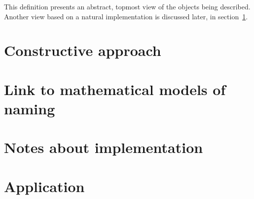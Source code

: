 \documentclass{article}
\begin{document}
This definition presents an abstract, topmost view of the objects being
described. Another view based on a natural implementation is discussed later,
in section~\ref{sec:constructive}.

\section{Constructive approach}\label{sec:constructive}

\section{Link to mathematical models of naming}

\section{Notes about implementation}

\section{Application}
\end{document}
